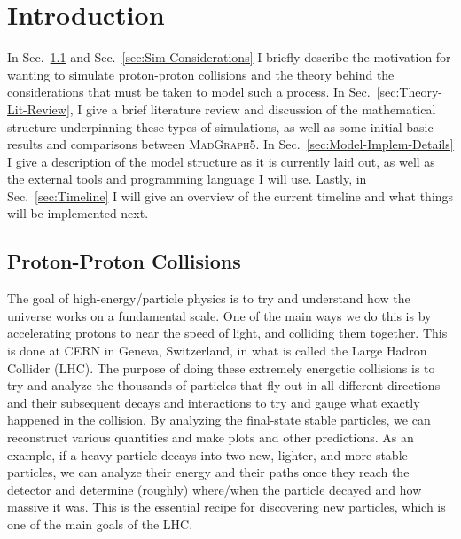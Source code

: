 \section{Introduction}

In Sec.~\ref{sec:PP-Collisions} and Sec.~\ref{sec:Sim-Considerations} I briefly describe the motivation for wanting to simulate proton-proton collisions and the theory behind the considerations that must be taken to model such a process. In Sec.~\ref{sec:Theory-Lit-Review}, I give a brief literature review and discussion of the mathematical structure underpinning these types of simulations, as well as some initial basic results and comparisons between \textsc{MadGraph5}. In Sec.~\ref{sec:Model-Implem-Details} I give a description of the model structure as it is currently laid out, as well as the external tools and programming language I will use. Lastly, in Sec.~\ref{sec:Timeline} I will give an overview of the current timeline and what things will be implemented next.


\subsection{Proton-Proton Collisions}\label{sec:PP-Collisions}



The goal of high-energy/particle physics is to try and understand how the universe works on a fundamental scale. One of the main ways we do this is by accelerating protons to near the speed of light, and colliding them together. This is done at CERN in Geneva, Switzerland, in what is called the Large Hadron Collider (LHC). The purpose of doing these extremely energetic collisions is to try and analyze the thousands of particles that fly out in all different directions and their subsequent decays and interactions to try and gauge what exactly happened in the collision. By analyzing the final-state stable particles, we can reconstruct various quantities and make plots and other predictions. As an example, if a heavy particle decays into two new, lighter, and more stable particles, we can analyze their energy and their paths once they reach the detector and determine (roughly) where/when the particle decayed and how massive it was. This is the essential recipe for discovering new particles, which is one of the main goals of the LHC.

